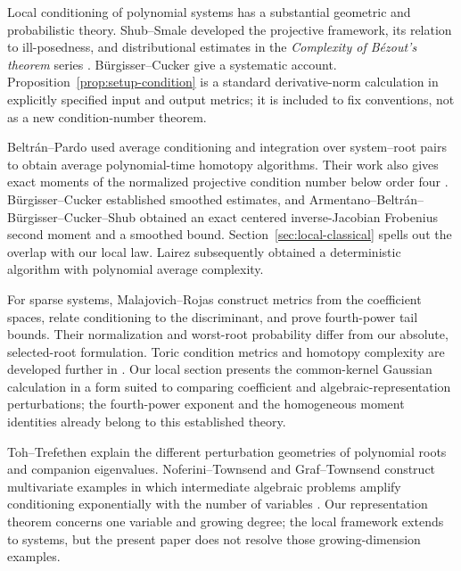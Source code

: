 Local conditioning of polynomial systems has a substantial geometric and
probabilistic theory. Shub--Smale developed the projective framework, its
relation to ill-posedness, and distributional estimates in the
\emph{Complexity of B\'ezout's theorem} series
\cite{shub1993geometric,shub1993volumes,shub1993packing}.
B\"urgisser--Cucker \cite{burgisser2013condition} give a systematic account.
Proposition~\ref{prop:setup-condition} is a standard derivative-norm
calculation in explicitly specified input and output metrics; it is included
to fix conventions, not as a new condition-number theorem.

Beltr\'an--Pardo \cite{beltran2009smale,beltran2011fast} used average
conditioning and integration over system--root pairs to obtain average
polynomial-time homotopy algorithms. Their work also gives exact moments of
the normalized projective condition number below order four
\cite[Sections~7--8]{beltran2011fast}.
B\"urgisser--Cucker \cite{burgisser2011smale} established smoothed estimates,
and Armentano--Beltr\'an--B\"urgisser--Cucker--Shub
\cite[Theorem~2]{armentano2016condition} obtained an exact centered
inverse-Jacobian Frobenius second moment and a smoothed bound.
Section~\ref{sec:local-classical} spells out the overlap with our local law.
Lairez \cite{lairez2017deterministic} subsequently obtained a deterministic
algorithm with polynomial average complexity.

For sparse systems, Malajovich--Rojas \cite{malajovich2004high} construct
metrics from the coefficient spaces, relate conditioning to the discriminant,
and prove fourth-power tail bounds. Their normalization and worst-root
probability differ from our absolute, selected-root formulation. Toric
condition metrics and homotopy complexity are developed further in
\cite{malajovich2019toric,malajovich2023renormalization}.
Our local section presents the common-kernel Gaussian calculation in a form
suited to comparing coefficient and algebraic-representation perturbations;
the fourth-power exponent and the homogeneous moment identities already
belong to this established theory.

Toh--Trefethen \cite{toh1994pseudozeros} explain the different perturbation
geometries of polynomial roots and companion eigenvalues. Noferini--Townsend
and Graf--Townsend construct multivariate examples in which intermediate
algebraic problems amplify conditioning exponentially with the number of
variables \cite{noferini2016numerical,graf2026numerical}. Our representation
theorem concerns one variable and growing degree; the local framework extends
to systems, but the present paper does not resolve those growing-dimension
examples.

